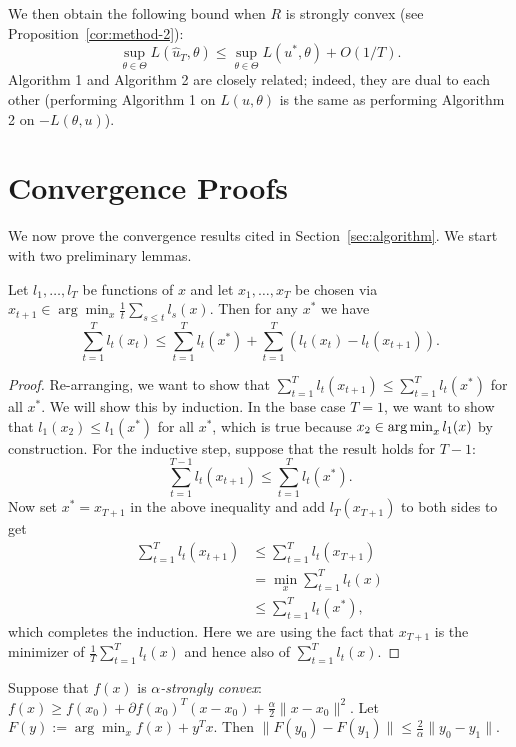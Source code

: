 \documentclass{article}
\begin{document}
We then obtain the following bound 
when $R$ is strongly convex (see Proposition~\ref{cor:method-2}):
\[ \sup_{\theta \in \Theta} L(\hat{u}_T, \theta) \leq \sup_{\theta \in \Theta} L(u^*, \theta) + O(1/T). \]
Algorithm 1 and Algorithm 2 are closely related; indeed, they are dual to each other 
(performing Algorithm 1 on $L(u,\theta)$ is the same as performing Algorithm 2 on 
$-L(\theta,u)$).

\section{Convergence Proofs}
\label{sec:proofs}
We now prove the convergence results cited in Section~\ref{sec:algorithm}. 
We start with two preliminary lemmas.
\begin{lemma}
\label{lem:ftl}
Let $l_1,\ldots,l_T$ be functions of $x$ and let $x_1,\ldots,x_T$ 
be chosen via $x_{t+1} \in \arg\min_{x} \frac{1}{t} \sum_{s \leq t} l_s(x)$. 
Then for any $x^*$ we have
\[ \sum_{t=1}^T l_t(x_t) \leq \sum_{t=1}^T l_t(x^*) + \sum_{t=1}^T (l_t(x_t) - l_t(x_{t+1})). \]
\end{lemma}
\begin{proof}
Re-arranging, we want to show that $\sum_{t=1}^T l_t(x_{t+1}) \leq \sum_{t=1}^T l_t(x^*)$ for 
all $x^*$. We will show this by induction. In the base case $T=1$, we want to show that $l_1(x_2) \leq l_1(x^*)$ 
for all $x^*$, which is true because $x_2 \in \argmin_x l_1(x)$ by construction. For 
the inductive step, suppose that the result holds for $T-1$:
\[ \sum_{t=1}^{T-1} l_t(x_{t+1}) \leq \sum_{t=1}^T l_t(x^*). \]
Now set $x^* = x_{T+1}$ in the above inequality and 
add $l_T(x_{T+1})$ to both sides to get
\begin{align*}
\sum_{t=1}^T l_t(x_{t+1}) &\leq \sum_{t=1}^T l_t(x_{T+1}) \\
 &= \min_{x} \sum_{t=1}^T l_t(x) \\
 &\leq \sum_{t=1}^T l_t(x^*),
\end{align*}
which completes the induction. Here we are using the fact that $x_{T+1}$ 
is the minimizer of $\frac{1}{T} \sum_{t=1}^T l_t(x)$ and hence also of 
$\sum_{t=1}^T l_t(x)$.
\end{proof}
\begin{lemma}
\label{lem:convexity}
Suppose that $f(x)$ is \emph{$\alpha$-strongly convex}: $f(x) \geq f(x_0) + \partial f(x_0)^T(x-x_0) + \frac{\alpha}{2}\|x-x_0\|^2$. 
Let $F(y) := \arg\min_x f(x) + y^Tx$. Then $\|F(y_0)-F(y_1)\| \leq \frac{2}{\alpha} \|y_0-y_1\|$.
\end{lemma}
\end{document}
